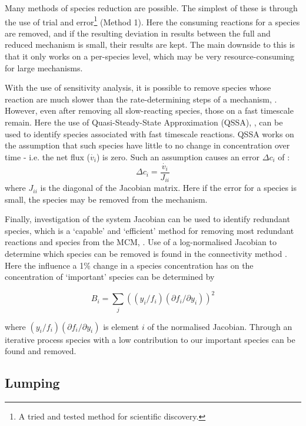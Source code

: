 Many methods of species reduction are possible. The simplest of these is through the use of trial and error\footnote{A tried and tested method for scientific discovery.} \citep{tur1990} (Method 1). Here the consuming reactions for a species are removed, and if the resulting deviation in results between the full and reduced mechanism is small, their results are kept. The main downside to this is that it only works on a per-species level, which may be very resource-consuming for large mechanisms.

With the use of sensitivity analysis, it is possible to remove species whose reaction are much slower than the rate-determining steps of a mechanism, \citep{frenk}. However, even after removing all slow-reacting species, those on a fast timescale remain. Here the use of Quasi-Steady-State Approximation (QSSA), \citep{QSSA}, can be used to identify species associated with fast timescale reactions. QSSA works on the assumption that such species have little to no change in concentration over time - i.e. the net flux ($\dot{v_i}$) is zero. Such an assumption causes an error $\Delta c_i$ of :
\begin{equation}
    \Delta c_i = \frac{\dot{v_i}}{J_{ii}}
\end{equation}  
where $J_{ii}$ is the diagonal of the Jacobian matrix. Here if the error for a species is small, the species may be removed from the mechanism. 


Finally, investigation of the system Jacobian can be used to identify redundant species, which is a `capable' and `efficient' method for removing most redundant reactions and species from the MCM, \citep{QSSA}. Use of a log-normalised Jacobian to determine which species can be removed is found in the connectivity method \cite{connectivity,cm}. 
Here the influence a 1\%  change in a species concentration has on the concentration of `important' species can be determined by

\begin{equation}
B_i  = \sum_j(({y_i}/{f_i})({\partial f_i}/{\partial y_i}))^2 \label{connectivity}
\end{equation}

 where $({y_i}/{f_i})({\partial f_i}/{\partial y_i})$ is element $i$ of the normalised Jacobian. Through an iterative process species with a low contribution to our important species can be found and removed.


\subsection{Lumping}

